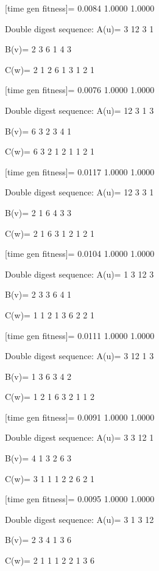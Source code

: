 [time gen fitness]=
    0.0084    1.0000    1.0000

Double digest sequence:
A(u)=
     3    12     3     1

B(v)=
     2     3     6     1     4     3

C(w)=
     2     1     2     6     1     3     1     2     1

[time gen fitness]=
    0.0076    1.0000    1.0000

Double digest sequence:
A(u)=
    12     3     1     3

B(v)=
     6     3     2     3     4     1

C(w)=
     6     3     2     1     2     1     1     2     1

[time gen fitness]=
    0.0117    1.0000    1.0000

Double digest sequence:
A(u)=
    12     3     3     1

B(v)=
     2     1     6     4     3     3

C(w)=
     2     1     6     3     1     2     1     2     1

[time gen fitness]=
    0.0104    1.0000    1.0000

Double digest sequence:
A(u)=
     1     3    12     3

B(v)=
     2     3     3     6     4     1

C(w)=
     1     1     2     1     3     6     2     2     1

[time gen fitness]=
    0.0111    1.0000    1.0000

Double digest sequence:
A(u)=
     3    12     1     3

B(v)=
     1     3     6     3     4     2

C(w)=
     1     2     1     6     3     2     1     1     2

[time gen fitness]=
    0.0091    1.0000    1.0000

Double digest sequence:
A(u)=
     3     3    12     1

B(v)=
     4     1     3     2     6     3

C(w)=
     3     1     1     1     2     2     6     2     1

[time gen fitness]=
    0.0095    1.0000    1.0000

Double digest sequence:
A(u)=
     3     1     3    12

B(v)=
     2     3     4     1     3     6

C(w)=
     2     1     1     1     2     2     1     3     6

